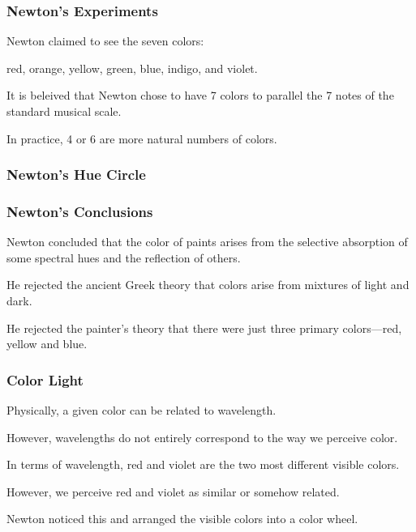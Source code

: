 \documentclass[12pt]{beamer}\usepackage[]{graphicx}\usepackage[]{color}
\begin{document}

\begin{frame}
\frametitle{Newton's Experiments}

\bbi
  \item Newton claimed to see the seven colors:
  \item red, orange, yellow, green, blue, indigo, and violet.
  \item It is beleived that Newton chose to have 7 colors to parallel the 7
  notes of the standard musical scale.
  \item In practice, 4 or 6 are more natural numbers of colors.
\ei

\end{frame}


\begin{frame}
\frametitle{Newton's Hue Circle}
\begin{center}
\end{center}
\end{frame}


\begin{frame}
\frametitle{Newton's Conclusions}

\bbi
  \item Newton concluded that the color of paints arises from the selective 
  absorption of some spectral hues and the reflection of others.
  \item He rejected the ancient Greek theory that colors arise from 
  mixtures of light and dark.
  \item He rejected the painter's theory that there were just three 
  primary colors---red, yellow and blue.
\ei

\end{frame}


\begin{frame}
\frametitle{Color Light}

\bbi
  \item Physically, a given color can be related to wavelength.
  \item However, wavelengths do not entirely correspond to the way we perceive
  color.
  \item In terms of wavelength, red and violet are the two most different 
  visible colors.
  \item However, we perceive red and violet as similar or somehow related.
  \item Newton noticed this and arranged the visible colors into a color wheel.
\ei

\end{frame}
\end{document}
